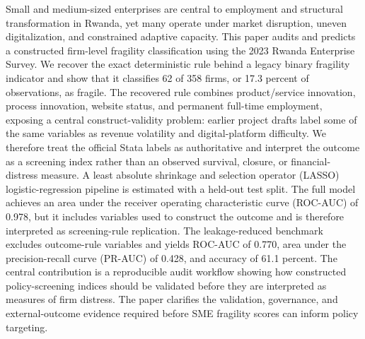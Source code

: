 Small and medium-sized enterprises are central to employment and structural transformation in Rwanda, yet many operate under market disruption, uneven digitalization, and constrained adaptive capacity. This paper audits and predicts a constructed firm-level fragility classification using the 2023 Rwanda Enterprise Survey. We recover the exact deterministic rule behind a legacy binary fragility indicator and show that it classifies 62 of 358 firms, or 17.3 percent of observations, as fragile. The recovered rule combines product/service innovation, process innovation, website status, and permanent full-time employment, exposing a central construct-validity problem: earlier project drafts label some of the same variables as revenue volatility and digital-platform difficulty. We therefore treat the official Stata labels as authoritative and interpret the outcome as a screening index rather than an observed survival, closure, or financial-distress measure. A least absolute shrinkage and selection operator (LASSO) logistic-regression pipeline is estimated with a held-out test split. The full model achieves an area under the receiver operating characteristic curve (ROC-AUC) of 0.978, but it includes variables used to construct the outcome and is therefore interpreted as screening-rule replication. The leakage-reduced benchmark excludes outcome-rule variables and yields ROC-AUC of 0.770, area under the precision-recall curve (PR-AUC) of 0.428, and accuracy of 61.1 percent. The central contribution is a reproducible audit workflow showing how constructed policy-screening indices should be validated before they are interpreted as measures of firm distress. The paper clarifies the validation, governance, and external-outcome evidence required before SME fragility scores can inform policy targeting.
